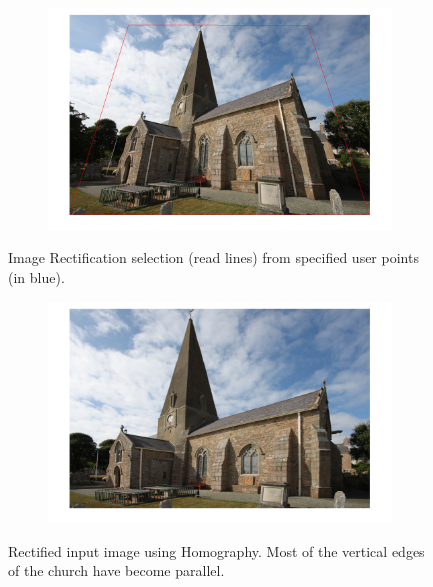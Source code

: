 \documentclass{paper}
\begin{document}
\begin{figure}[H]
    \centering
    \begin{subfigure}{1.0\textwidth}
        \includegraphics[width=\textwidth]{rectify/selection_skewed_church}
    \end{subfigure}
    
    \caption{Image Rectification selection (read lines) from specified user points (in blue).}
    \label{fig:rectify_selection_skewed_church}       
\end{figure}

\begin{figure}[H]
    \centering
    \begin{subfigure}{1.0\textwidth}
        \includegraphics[width=\textwidth]{rectify/rectified_skewed_church}
    \end{subfigure}
    
    \caption{Rectified input image using Homography. Most of the vertical edges of the church have become parallel. }
    \label{fig:rectified_skewed_church}       
\end{figure}
\end{document}
